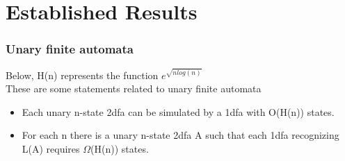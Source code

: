 \documentclass{beamer}
\begin{document}
\section{Established Results}



\begin{frame}
\frametitle{Unary finite automata}
Below, H(n) represents the function  $e^{\sqrt{nlog(n)}}$\\
\medskip
These are some statements related to unary finite automata
\medskip


\begin{itemize}
\item Each unary n-state 2dfa can be simulated by a 1dfa with O(H(n)) states.
\item For each n there is a unary n-state 2dfa A such that each 1dfa recognizing L(A) requires $\Omega$(H(n)) states.
\end{itemize}

\end{frame}
\end{document}
